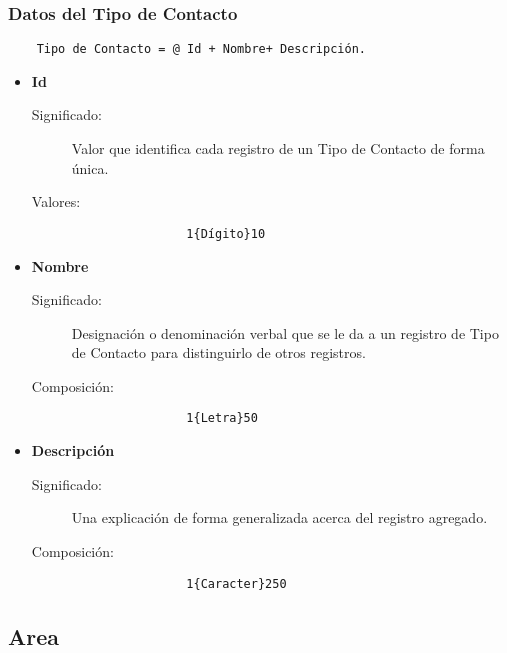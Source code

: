 \subsubsection{Datos del Tipo de Contacto}
\begin{lstlisting}
	Tipo de Contacto = @ Id + Nombre+ Descripción.
\end{lstlisting}
\begin{itemize}
	\item	\textbf{Id}
		\begin{description}
			\item [Significado:] Valor que identifica cada registro de un Tipo de Contacto de forma única.
			\item [Valores:]{\begin{lstlisting}
				1{Dígito}10\end{lstlisting}}
		\end{description}
	\item \textbf{Nombre}
		\begin{description}
			\item [Significado:] Designación o denominación verbal que se le da a un registro de Tipo de Contacto para distinguirlo de otros registros.
			\item [Composición:]{\begin{lstlisting}
				1{Letra}50\end{lstlisting}}
		\end{description}
	\item \textbf{Descripción}
		\begin{description}
			\item [Significado:] Una explicación de forma generalizada acerca del registro agregado.
			\item [Composición:]{\begin{lstlisting}
				1{Caracter}250\end{lstlisting}}
		\end{description}
\end{itemize}


\subsection{Area}
\label{dd:Area}

